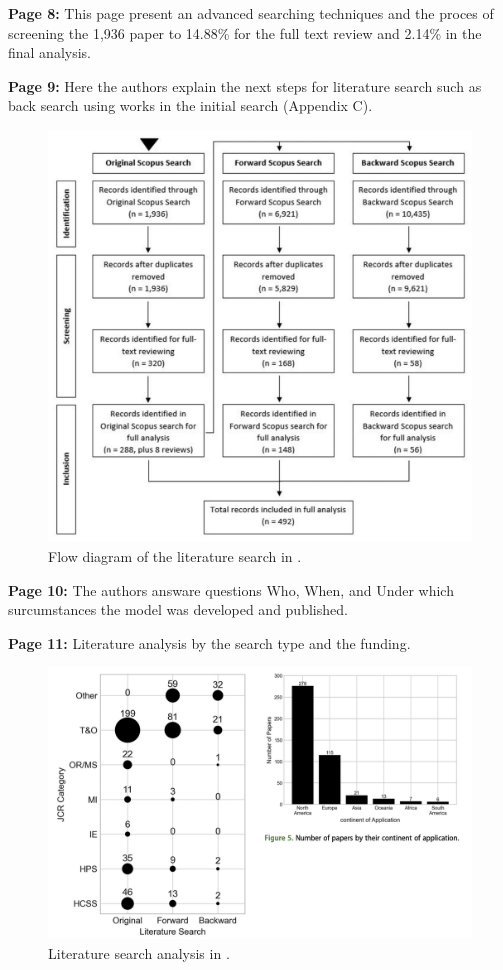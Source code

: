     \textbf{Page 8:}
    This page present an advanced searching techniques and the proces of screening the 1,936 paper to 14.88\% for the full text review and 2.14\% in the final analysis. 
    
    \textbf{Page 9:}
    Here the authors explain the next steps for literature search such as back search using works in the initial search (Appendix C).
    \begin{figure}[H]
        \centering
        \includegraphics[width=.8\textwidth]{figures/SR0005GB23/fig2.png}
        \caption{Flow diagram of the literature search in \cite{x122}.}
        \label{fig2:SR0005GB23}
    \end{figure}
    
    \textbf{Page 10:}
    The authors answare questions Who, When, and Under which surcumstances the model was developed and published.
    
    \textbf{Page 11:}
    Literature analysis by the search type and the funding.
    \begin{figure}[H]
        \centering
        \includegraphics[width=.8\textwidth]{figures/SR0005GB23/fig3.png}
        \caption{Literature search analysis in \cite{x122}.}
        \label{fig3:SR0005GB23}
    \end{figure}

